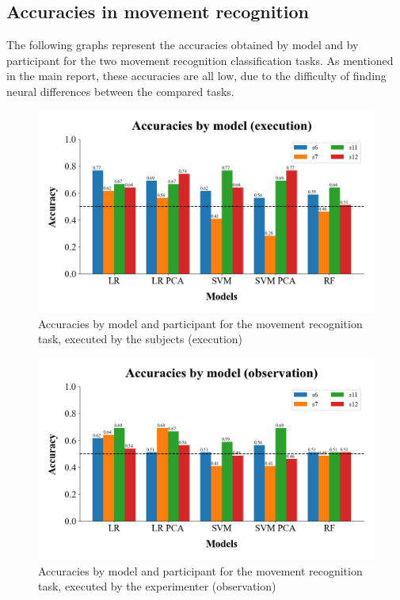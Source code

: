 \documentclass[10pt,conference,compsocconf]{IEEEtran}
\begin{document}
\subsection{Accuracies in movement recognition}
The following graphs represent the accuracies obtained by model and by participant for the two movement recognition classification tasks. As mentioned in the main report, these accuracies are all low, due to the difficulty of finding neural differences between the compared tasks.

\begin{figure}[h!]
    \center
    \includegraphics[width=\linewidth]{../Code/figures/accuracies_across_part_ex.png}
    \caption{Accuracies by model and participant for the movement recognition task, executed by the subjects (execution)}
\end{figure}
\FloatBarrier

\begin{figure}[h!]
    \center
    \includegraphics[width=\linewidth]{../Code/figures/accuracies_across_part_obs.png}
    \caption{Accuracies by model and participant for the movement recognition task, executed by the experimenter (observation)}
\end{figure}
\FloatBarrier
\end{document}
